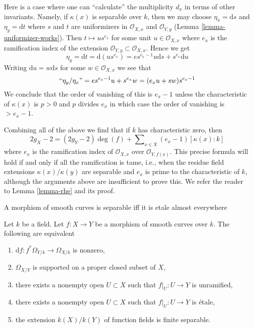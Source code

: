 \medskip\noindent
Here is a case where one can ``calculate'' the multiplicity $d_x$ in terms
of other invariants. Namely, if $\kappa(x)$ is separable over $k$, then
we may choose $\eta_x = \text{d}s$ and $\eta_y = \text{d}t$ where $s$
and $t$ are uniformizers in $\mathcal{O}_{X, x}$ and $\mathcal{O}_{Y, y}$
(Lemma \ref{lemma-uniformizer-works}).
Then $t \mapsto u s^{e_x}$ for some unit $u \in \mathcal{O}_{X, x}$
where $e_x$ is the ramification index of the extension
$\mathcal{O}_{Y, y} \subset \mathcal{O}_{X, x}$. Hence we get
$$
\eta_y = \text{d}t = \text{d}(u s^{e_x}) =
e s^{e_x - 1} u \text{d}s + s^{e_x} \text{d}u
$$
Writing $\text{d}u = w \text{d}s$ for some $w \in \mathcal{O}_{X, x}$
we see that
$$
``\eta_y/\eta_x" = e s^{e_x - 1} u + s^{e_x} w = (e_x u + s w)s^{e_x - 1}
$$
We conclude that the order of vanishing of this is $e_x - 1$
unless the characteristic of $\kappa(x)$ is $p > 0$ and $p$ divides $e_x$
in which case the order of vanishing is $> e_x - 1$.

\medskip\noindent
Combining all of the above we find that if $k$ has characteristic
zero, then
$$
2g_X - 2 = (2g_Y - 2)\deg(f) +
\sum\nolimits_{x \in X} (e_x - 1)[\kappa(x) : k]
$$
where $e_x$ is the ramification index of $\mathcal{O}_{X, x}$ over
$\mathcal{O}_{Y, f(x)}$. This precise formula will hold if and only
if all the ramification is tame, i.e., when the
residue field extensions $\kappa(x)/\kappa(y)$ are separable and
$e_x$ is prime to the characteristic of $k$, although the
arguments above are insufficient to prove this. We refer the reader
to Lemma \ref{lemma-rhe} and its proof.

\begin{lemma}
\label{lemma-generically-etale}
\begin{slogan}
A morphism of smooth curves is separable iff it is etale almost everywhere
\end{slogan}
Let $k$ be a field. Let $f : X \to Y$ be a morphism of smooth curves over $k$.
The following are equivalent
\begin{enumerate}
\item $\text{d}f : f^*\Omega_{Y/k} \to \Omega_{X/k}$ is nonzero,
\item $\Omega_{X/Y}$ is supported on a proper closed subset of $X$,
\item there exists a nonempty open $U \subset X$ such that
$f|_U : U \to Y$ is unramified,
\item there exists a nonempty open $U \subset X$ such that
$f|_U : U \to Y$ is \'etale,
\item the extension $k(X)/k(Y)$ of function fields is
finite separable.
\end{enumerate}
\end{lemma}

